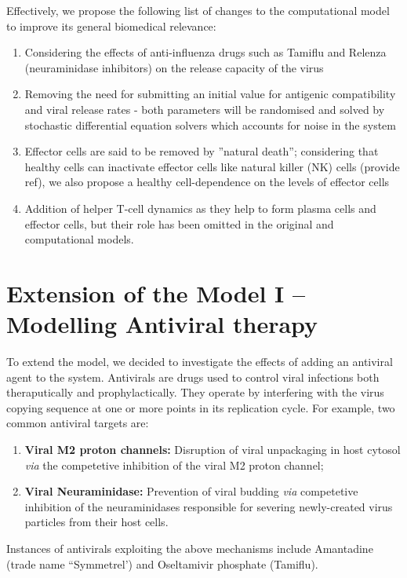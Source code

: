 \documentclass[a4paper, 12pt]{report}
\begin{document}
Effectively, we propose the following list of changes to the computational model to improve its general biomedical relevance:
\begin{enumerate}
\item Considering the effects of anti-influenza drugs such as Tamiflu and Relenza (neuraminidase inhibitors) on the release capacity of the virus
\item Removing the need for submitting an initial value for antigenic compatibility and viral release rates - both parameters will be randomised and solved by stochastic differential equation solvers which accounts for noise in the system
\item Effector cells are said to be removed by ''natural death''; considering that healthy cells can inactivate effector cells like natural killer (NK) cells (provide ref), we also propose a healthy cell-dependence on the levels of effector cells
\item Addition of helper T-cell dynamics as they help to form plasma cells and effector cells, but their role has been omitted in the original and computational models.
\end{enumerate}

\section{Extension of the Model I -- Modelling Antiviral therapy}

To extend the model, we decided to investigate the effects of adding an antiviral agent to the system.
Antivirals are drugs used to control viral infections both theraputically and prophylactically. They operate by interfering with the virus copying sequence at one or more points in its replication cycle. For example, two common antiviral targets are:
\begin{enumerate}
\item \textbf{Viral M2 proton channels:} Disruption of viral unpackaging in host cytosol \textit{via} the competetive inhibition of the viral M2 proton channel;~\cite{}
\item \textbf{Viral Neuraminidase:} Prevention of viral budding \textit{via} competetive inhibition of the neuraminidases responsible for severing newly-created virus particles from their host cells.\cite{}  
\end{enumerate}
Instances of antivirals exploiting the above mechanisms include  Amantadine (trade name ``Symmetrel') and Oseltamivir phosphate (Tamiflu).\\
\end{document}
